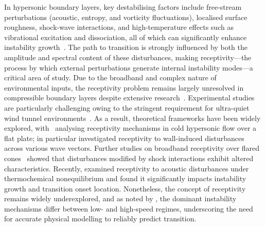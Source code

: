 In hypersonic boundary layers, key destabilising factors include free-stream perturbations (acoustic, entropy, and vorticity fluctuations), localised surface roughness, shock-wave interactions, and high-temperature effects such as vibrational excitation and dissociation, all of which can significantly enhance instability growth~\citep{vandereynde2015,BitterShepherd2015}. The path to transition is strongly influenced by both the amplitude and spectral content of these disturbances, making receptivity---the process by which external perturbations generate internal instability modes---a critical area of study. Due to the broadband and complex nature of environmental inputs, the receptivity problem remains largely unresolved in compressible boundary layers despite extensive research~\citep{Cerminara2019}. Experimental studies are particularly challenging owing to the stringent requirement for ultra-quiet wind tunnel environments~\citep{Fedorov2011}. As a result, theoretical frameworks have been widely explored, with~\citet{Fedorov2001,Fedorov2002,MaZhong2003a,MaZhong2003b} analysing receptivity mechanisms in cold hypersonic flow over a flat plate; \citet{Fedorov2002} in particular investigated receptivity to wall-induced disturbances across various wave vectors. Further studies on broadband receptivity over flared cones~\citep{Balakumar2018,HeZhong2022} showed that disturbances modified by shock interactions exhibit altered characteristics. Recently, \citet{Varma2025} examined receptivity to acoustic disturbances under thermochemical nonequilibrium and found it significantly impacts instability growth and transition onset location. Nonetheless, the concept of receptivity remains widely underexplored, and as noted by \citet{Zhong2012}, the dominant instability mechanisms differ between low- and high-speed regimes, underscoring the need for accurate physical modelling to reliably predict transition.

